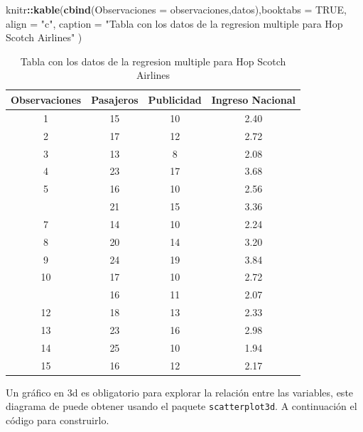 \documentclass[
]{book}
\newenvironment{Shaded}{\begin{snugshade}}{\end{snugshade}}
\newcommand{\AttributeTok}[1]{\textcolor[rgb]{0.13,0.29,0.53}{#1}}
\newcommand{\ConstantTok}[1]{\textcolor[rgb]{0.56,0.35,0.01}{#1}}
\newcommand{\FunctionTok}[1]{\textcolor[rgb]{0.13,0.29,0.53}{\textbf{#1}}}
\newcommand{\NormalTok}[1]{#1}
\newcommand{\SpecialCharTok}[1]{\textcolor[rgb]{0.81,0.36,0.00}{\textbf{#1}}}
\newcommand{\StringTok}[1]{\textcolor[rgb]{0.31,0.60,0.02}{#1}}
\begin{document}
\begin{Shaded}
\begin{Highlighting}[]
\NormalTok{knitr}\SpecialCharTok{::}\FunctionTok{kable}\NormalTok{(}\FunctionTok{cbind}\NormalTok{(}\AttributeTok{Observaciones =}\NormalTok{ observaciones,datos),}\AttributeTok{booktabs =} \ConstantTok{TRUE}\NormalTok{, }\AttributeTok{align =} \StringTok{"c"}\NormalTok{, }\AttributeTok{caption =} \StringTok{"Tabla con los datos de la regresion  multiple para Hop Scotch Airlines"}\NormalTok{ ) }
\end{Highlighting}
\end{Shaded}

\begin{table}

\caption{\label{tab:defdatos}Tabla con los datos de la regresion  multiple para Hop Scotch Airlines}
\centering
\begin{tabular}[t]{cccc}
\toprule
Observaciones & Pasajeros & Publicidad & Ingreso Nacional\\
\midrule
1 & 15 & 10 & 2.40\\
2 & 17 & 12 & 2.72\\
3 & 13 & 8 & 2.08\\
4 & 23 & 17 & 3.68\\
5 & 16 & 10 & 2.56\\
\addlinespace
6 & 21 & 15 & 3.36\\
7 & 14 & 10 & 2.24\\
8 & 20 & 14 & 3.20\\
9 & 24 & 19 & 3.84\\
10 & 17 & 10 & 2.72\\
\addlinespace
11 & 16 & 11 & 2.07\\
12 & 18 & 13 & 2.33\\
13 & 23 & 16 & 2.98\\
14 & 25 & 10 & 1.94\\
15 & 16 & 12 & 2.17\\
\bottomrule
\end{tabular}
\end{table}

Un gráfico en 3d es obligatorio para explorar la relación entre las variables, este diagrama de puede obtener usando el paquete \texttt{scatterplot3d}. A continuación el código para construirlo.
\end{document}

